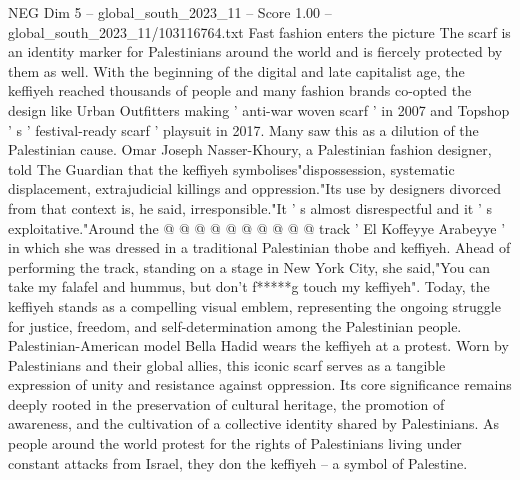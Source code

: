 \begin{textsample}{NEG Dim 5 – global\_south\_2023\_11 – Score 1.00 – global\_south\_2023\_11/103116764.txt}
Fast fashion enters the picture The scarf is an identity marker for Palestinians around the world and is fiercely protected by them as well.
With the beginning of the digital and late capitalist age, the keffiyeh reached thousands of people and many fashion brands co-opted the design like Urban Outfitters making ' anti-war woven scarf ' in 2007 and Topshop ' s ' festival-ready scarf ' playsuit in 2017.
Many saw this as a dilution of the Palestinian cause.
Omar Joseph Nasser-Khoury, a Palestinian fashion designer, told The Guardian that the keffiyeh symbolises"dispossession, systematic displacement, extrajudicial killings and oppression."Its use by designers divorced from that context is, he said, irresponsible."It ' s almost disrespectful and it ' s exploitative."Around the @ @ @ @ @ @ @ @ @ @ track ' El Koffeyye Arabeyye ' in which she was dressed in a traditional Palestinian thobe and keffiyeh.
Ahead of performing the track, standing on a stage in New York City, she said,"You can take my falafel and hummus, but don't f*****g touch my keffiyeh".
Today, the keffiyeh stands as a compelling visual emblem, representing the ongoing struggle for justice, freedom, and self-determination among the Palestinian people.
Palestinian-American model Bella Hadid wears the keffiyeh at a protest.
Worn by Palestinians and their global allies, this iconic scarf serves as a tangible expression of unity and resistance against oppression.
Its core significance remains deeply rooted in the preservation of cultural heritage, the promotion of awareness, and the cultivation of a collective identity shared by Palestinians.
As people around the world protest for the rights of Palestinians living under constant attacks from Israel, they don the keffiyeh -- a symbol of Palestine.

\end{textsample}
